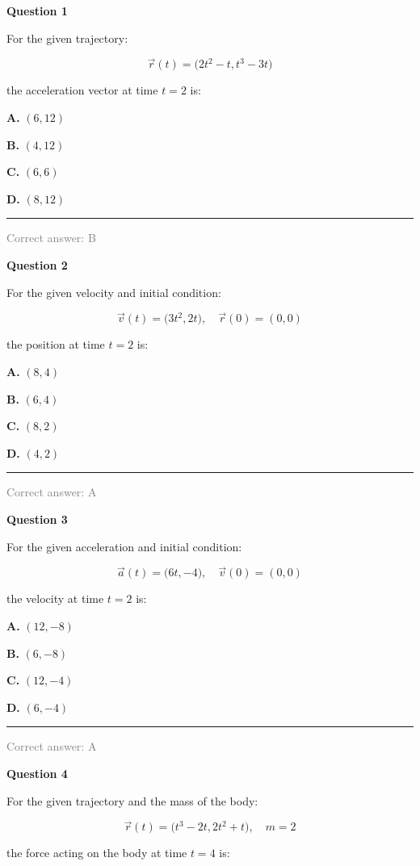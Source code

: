 \documentclass[11pt,a4paper]{article}
\newcommand{\answernote}[1]{%
\vfill
\noindent\textcolor{gray}{\rule{\linewidth}{0.4pt}}

{\small\textcolor{gray}{Correct answer: #1}}
}
\begin{document}
{\LARGE\textbf{Question 1}}

For the given trajectory:

\[
\vec r(t) = \bigl(2t^2 - t, t^3 - 3t\bigr)
\]

the acceleration vector at time $t=2$ is:

\vspace{0.5em}

{\large
\textbf{A.} $(6, 12)$

\textbf{B.} $(4, 12)$

\textbf{C.} $(6, 6)$

\textbf{D.} $(8, 12)$
}

\answernote{B}
\newpage

{\LARGE\textbf{Question 2}}

For the given velocity and initial condition:

\[
\vec v(t) = \bigl(3t^2, 2t\bigr), \quad \vec r(0)=(0,0)
\]

the position at time $t=2$ is:

\vspace{0.5em}

{\large
\textbf{A.} $(8, 4)$

\textbf{B.} $(6, 4)$

\textbf{C.} $(8, 2)$

\textbf{D.} $(4, 2)$
}

\answernote{A}
\newpage

{\LARGE\textbf{Question 3}}

For the given acceleration and initial condition:

\[
\vec a(t) = \bigl(6t, -4\bigr), \quad \vec v(0)=(0,0)
\]

the velocity at time $t=2$ is:

\vspace{0.5em}

{\large
\textbf{A.} $(12, -8)$

\textbf{B.} $(6, -8)$

\textbf{C.} $(12, -4)$

\textbf{D.} $(6, -4)$
}

\answernote{A}
\newpage

{\LARGE\textbf{Question 4}}

For the given trajectory and the mass of the body:

\[
\vec r(t) = \bigl(t^3 - 2t, 2t^2 + t\bigr), \quad m = 2
\]

the force acting on the body at time $t=4$ is:

\vspace{0.5em}
\end{document}
